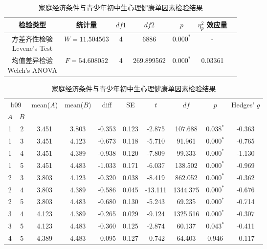 \documentclass[zihao = -4, linespread = 1.5]{article}
\begin{document}
\begin{table}[htbp]
    \centering
    \setlength{\tabcolsep}{8pt}
    \renewcommand{\arraystretch}{1.2}
    \caption{家庭经济条件与青少年初中生心理健康单因素检验结果}\label{table-anova-economy-health}
    \begin{tabular}{ccccccc}
        \bottomrule[1.5pt]
        检验类型 & 统计量 & $df1$ & $df2$ & $p$ & $\eta^2_p$ 效应量 \\
        \midrule[0.75pt]
        \makecell{方差齐性检验 \\ Levene's Test} & $W=11.504563$ & 4 & 6886 & $\bm{0.000^{*}}$ & - \\
        \midrule[0.75pt]
        \makecell{均值差异检验 \\ Welch's ANOVA} & $F=54.608052$ & 4 & 269.899562 & $\bm{0.000^{*}}$ & 0.03361 \\
    \end{tabular}
    \setlength{\tabcolsep}{6pt}
    \renewcommand{\arraystretch}{1.2}
    \begin{tabular}{cccccccccc}
        \bottomrule[1.5pt]
        \multicolumn{2}{c}{b09} & \multirow{2}{*}{mean($A$)} & \multirow{2}{*}{mean($B$)} & \multirow{2}{*}{diff} & \multirow{2}{*}{SE} & \multirow{2}{*}{$t$} & \multirow{2}{*}{$df$} & \multirow{2}{*}{$p$} & \multirow{2}{*}{Hedges' $g$} \\
        \cmidrule[0.75pt](lr){1-2}
        $A$ & $B$ \\
        \midrule[0.75pt]
        1 & 2 & 3.451 & 3.803 & -0.353 & 0.123 & -2.875 & 107.688 & $\bm{0.038^{*}}$ & -0.363 \\
        1 & 3 & 3.451 & 4.123 & -0.673 & 0.118 & -5.710 & 91.961 & $\bm{0.000^{*}}$ & -0.765 \\
        1 & 4 & 3.451 & 4.389 & -0.938 & 0.120 & -7.809 & 99.333 & $\bm{0.000^{*}}$ & -1.130 \\
        1 & 5 & 3.451 & 4.483 & -1.033 & 0.171 & -6.037 & 138.502 & $\bm{0.000^{*}}$ & -0.969 \\
        2 & 3 & 3.803 & 4.123 & -0.320 & 0.038 & -8.419 & 862.052 & $\bm{0.000^{*}}$ & -0.362 \\
        2 & 4 & 3.803 & 4.389 & -0.586 & 0.045 & -13.111 & 1344.375 & $\bm{0.000^{*}}$ & -0.676 \\
        2 & 5 & 3.803 & 4.483 & -0.680 & 0.130 & -5.243 & 69.235 & $\bm{0.000^{*}}$ & -0.714 \\
        3 & 4 & 4.123 & 4.389 & -0.265 & 0.029 & -9.124 & 1325.516 & $\bm{0.000^{*}}$ & -0.307 \\
        3 & 5 & 4.123 & 4.483 & -0.360 & 0.125 & -2.874 & 60.137 & $\bm{0.043^{*}}$ & -0.411 \\
        4 & 5 & 4.389 & 4.483 & -0.095 & 0.127 & -0.742 & 64.403 & 0.946 & -0.117 \\
        \toprule[1.5pt]
    \end{tabular}
\end{table}
\end{document}
